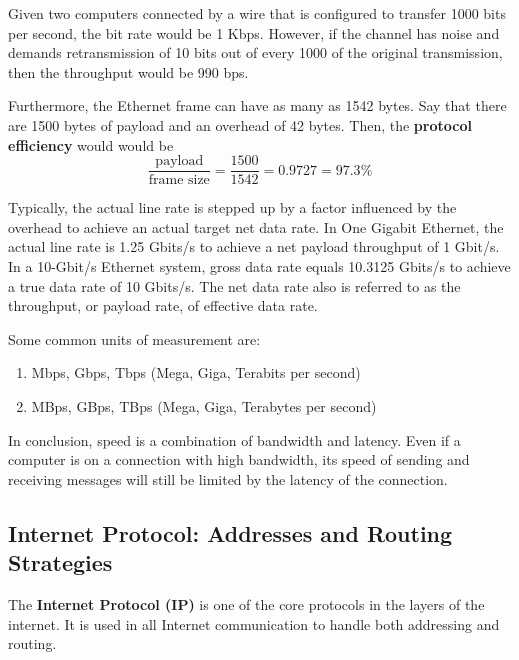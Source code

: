 \documentclass[a4paper, 12pt]{report}
\theoremstyle{remark}
\theoremstyle{definition}
\begin{document}
\begin{example}
Given two computers connected by a wire that is configured to transfer 1000 bits per second, the bit rate would be 1 Kbps. However, if the channel has noise and demands retransmission of 10 bits out of every 1000 of the original transmission, then the throughput would be 990 bps. 

Furthermore, the Ethernet frame can have as many as 1542 bytes. Say that there are 1500 bytes of payload and an overhead of 42 bytes. Then, the \textbf{protocol efficiency} would would be 
\[\frac{\text{payload}}{\text{frame size}} = \frac{1500}{1542} = 0.9727 = 97.3\%\]
\end{example}

Typically, the actual line rate is stepped up by a factor influenced by the overhead to achieve an actual target net data rate. In One Gigabit Ethernet, the actual line rate is 1.25 Gbits/s to achieve a net payload throughput of 1 Gbit/s. In a 10-Gbit/s Ethernet system, gross data rate equals 10.3125 Gbits/s to achieve a true data rate of 10 Gbits/s. The net data rate also is referred to as the throughput, or payload rate, of effective data rate. 

Some common units of measurement are: 
\begin{enumerate}
    \item Mbps, Gbps, Tbps (Mega, Giga, Terabits per second)
    \item MBps, GBps, TBps (Mega, Giga, Terabytes per second)
\end{enumerate}

In conclusion, speed is a combination of bandwidth and latency. Even if a computer is on a connection with high bandwidth, its speed of sending and receiving messages will still be limited by the latency of the connection.

\subsection{Internet Protocol: Addresses and Routing Strategies}
The \textbf{Internet Protocol (IP)} is one of the core protocols in the layers of the internet. It is used in all Internet communication to handle both addressing and routing. 
\end{document}
